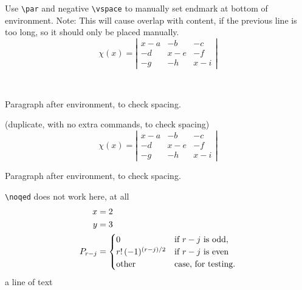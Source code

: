 \documentclass[leqno]{article}
\begin{document}
\begin{test} 
  Use \verb|\par| and negative \verb|\vspace| to manually set endmark at bottom of environment.
  Note: This will cause overlap with content, if the previous line is too long, so it should only be placed manually.
  \begin{equation*}
    \chi(x) =
    \left|              %
      \begin{array}{ccc}
        x-a  &-b  &-c  \\
        -d   &x-e &-f  \\
        -g   &-h  &x-i
      \end{array}
    \right|%
  \end{equation*}
  \par\vspace{-1.3\baselineskip}~
\end{test}

Paragraph after environment, to check spacing.
\emph{\color{gray}\kant[2][1-3]}

\begin{test} (duplicate, with no extra commands, to check spacing)
  \begin{equation*}
    \chi(x) =
    \left|              %
      \begin{array}{ccc}
        x-a  &-b  &-c  \\
        -d   &x-e &-f  \\
        -g   &-h  &x-i
      \end{array}
    \right|
  \end{equation*}
\end{test}

Paragraph after environment, to check spacing.
\emph{\color{gray}\kant[2][1-3]}


\begin{test} 
  \verb|\noqed| does not work here, at all
  \begin{align}
    x & = 2\\
    y & = 3\\
    P_{r-j} & =
    \begin{cases}
      0& \text{if $r-j$ is odd},\\
      r!\,(-1)^{(r-j)/2}& \text{if $r-j$ is even}\\
      \text{other} & \text{case, for testing.}\noqed
    \end{cases} \noqed
  \end{align}\noqed
  a line of text \noqed 
\end{test}
\end{document}
